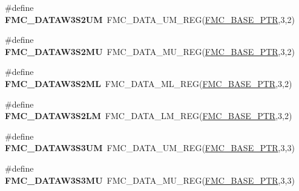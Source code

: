 \begin{DoxyCompactItemize}
\item 
\hypertarget{group___f_m_c___register___accessor___macros_gabfc97b09acabf95bcecf39c8c0a7b17e}{}\#define {\bfseries F\+M\+C\+\_\+\+D\+A\+T\+A\+W3\+S2\+U\+M}~F\+M\+C\+\_\+\+D\+A\+T\+A\+\_\+\+U\+M\+\_\+\+R\+E\+G(\hyperlink{group___f_m_c___peripheral_ga0a740437b573e32e6b932bf729485fd9}{F\+M\+C\+\_\+\+B\+A\+S\+E\+\_\+\+P\+T\+R},3,2)\label{group___f_m_c___register___accessor___macros_gabfc97b09acabf95bcecf39c8c0a7b17e}

\item 
\hypertarget{group___f_m_c___register___accessor___macros_ga28dfeb1e3734084974050c38fed49a7d}{}\#define {\bfseries F\+M\+C\+\_\+\+D\+A\+T\+A\+W3\+S2\+M\+U}~F\+M\+C\+\_\+\+D\+A\+T\+A\+\_\+\+M\+U\+\_\+\+R\+E\+G(\hyperlink{group___f_m_c___peripheral_ga0a740437b573e32e6b932bf729485fd9}{F\+M\+C\+\_\+\+B\+A\+S\+E\+\_\+\+P\+T\+R},3,2)\label{group___f_m_c___register___accessor___macros_ga28dfeb1e3734084974050c38fed49a7d}

\item 
\hypertarget{group___f_m_c___register___accessor___macros_ga047573de2c50feb133ab11e1dd5c921f}{}\#define {\bfseries F\+M\+C\+\_\+\+D\+A\+T\+A\+W3\+S2\+M\+L}~F\+M\+C\+\_\+\+D\+A\+T\+A\+\_\+\+M\+L\+\_\+\+R\+E\+G(\hyperlink{group___f_m_c___peripheral_ga0a740437b573e32e6b932bf729485fd9}{F\+M\+C\+\_\+\+B\+A\+S\+E\+\_\+\+P\+T\+R},3,2)\label{group___f_m_c___register___accessor___macros_ga047573de2c50feb133ab11e1dd5c921f}

\item 
\hypertarget{group___f_m_c___register___accessor___macros_ga9f05ec09a2c56ed82f23eee265f7de6e}{}\#define {\bfseries F\+M\+C\+\_\+\+D\+A\+T\+A\+W3\+S2\+L\+M}~F\+M\+C\+\_\+\+D\+A\+T\+A\+\_\+\+L\+M\+\_\+\+R\+E\+G(\hyperlink{group___f_m_c___peripheral_ga0a740437b573e32e6b932bf729485fd9}{F\+M\+C\+\_\+\+B\+A\+S\+E\+\_\+\+P\+T\+R},3,2)\label{group___f_m_c___register___accessor___macros_ga9f05ec09a2c56ed82f23eee265f7de6e}

\item 
\hypertarget{group___f_m_c___register___accessor___macros_ga8236c7d176fe66d8ace8b6f5b9c3360c}{}\#define {\bfseries F\+M\+C\+\_\+\+D\+A\+T\+A\+W3\+S3\+U\+M}~F\+M\+C\+\_\+\+D\+A\+T\+A\+\_\+\+U\+M\+\_\+\+R\+E\+G(\hyperlink{group___f_m_c___peripheral_ga0a740437b573e32e6b932bf729485fd9}{F\+M\+C\+\_\+\+B\+A\+S\+E\+\_\+\+P\+T\+R},3,3)\label{group___f_m_c___register___accessor___macros_ga8236c7d176fe66d8ace8b6f5b9c3360c}

\item 
\hypertarget{group___f_m_c___register___accessor___macros_ga576b8b5521486bd2e46495bfc03d730c}{}\#define {\bfseries F\+M\+C\+\_\+\+D\+A\+T\+A\+W3\+S3\+M\+U}~F\+M\+C\+\_\+\+D\+A\+T\+A\+\_\+\+M\+U\+\_\+\+R\+E\+G(\hyperlink{group___f_m_c___peripheral_ga0a740437b573e32e6b932bf729485fd9}{F\+M\+C\+\_\+\+B\+A\+S\+E\+\_\+\+P\+T\+R},3,3)\label{group___f_m_c___register___accessor___macros_ga576b8b5521486bd2e46495bfc03d730c}


\end{DoxyCompactItemize}
